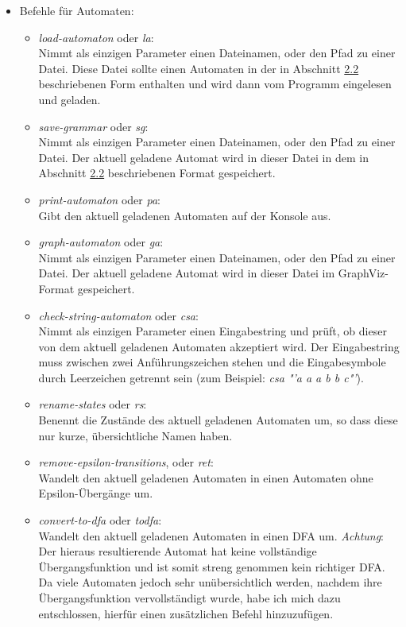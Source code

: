 \begin{itemize}
	\item Befehle für Automaten:
	\begin{itemize}
		\item \textit{load-automaton} oder \textit{la}:\\
		Nimmt als einzigen Parameter einen Dateinamen, oder den Pfad zu einer Datei. Diese Datei sollte einen Automaten in der in Abschnitt \hyperref[sec:2.2]{2.2} beschriebenen Form enthalten und wird dann vom Programm eingelesen und geladen.
		\item \textit{save-grammar} oder \textit{sg}:\\
		Nimmt als einzigen Parameter einen Dateinamen, oder den Pfad zu einer Datei. Der aktuell geladene Automat wird in dieser Datei in dem in Abschnitt \hyperref[sec:2.2]{2.2} beschriebenen Format gespeichert.
		\item \textit{print-automaton} oder \textit{pa}:\\
		Gibt den aktuell geladenen Automaten auf der Konsole aus.
		\item \textit{graph-automaton} oder \textit{ga}:\\
		Nimmt als einzigen Parameter einen Dateinamen, oder den Pfad zu einer Datei. Der aktuell geladene Automat wird in dieser Datei im GraphViz-Format gespeichert.
		\item \textit{check-string-automaton} oder \textit{csa}:\\
		Nimmt als einzigen Parameter einen Eingabestring und prüft, ob dieser von dem aktuell geladenen Automaten akzeptiert wird. Der Eingabestring muss zwischen zwei Anführungszeichen stehen und die Eingabesymbole durch Leerzeichen getrennt sein (zum Beispiel: \textit{csa "'a a a b b c"'}).
		\item \textit{rename-states} oder \textit{rs}:\\
		Benennt die Zustände des aktuell geladenen Automaten um, so dass diese nur kurze, übersichtliche Namen haben.
		\item \textit{remove-epsilon-transitions}, oder \textit{ret}:\\
		Wandelt den aktuell geladenen Automaten in einen Automaten ohne Epsilon-Übergänge um.
		\item \textit{convert-to-dfa} oder \textit{todfa}:\\
		Wandelt den aktuell geladenen Automaten in einen DFA um. \textit{Achtung}: Der hieraus resultierende Automat hat keine vollständige Übergangsfunktion und ist somit streng genommen kein richtiger DFA. Da viele Automaten jedoch sehr unübersichtlich werden, nachdem ihre Übergangsfunktion vervollständigt wurde, habe ich mich dazu entschlossen, hierfür einen zusätzlichen Befehl hinzuzufügen.

\end{itemize}
\end{itemize}

